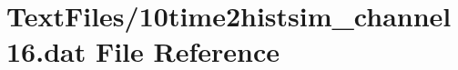 \hypertarget{10time2histsim__channel16_8dat}{}\section{Text\+Files/10time2histsim\+\_\+channel16.dat File Reference}
\label{10time2histsim__channel16_8dat}
